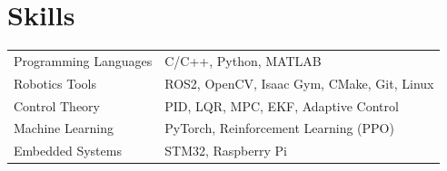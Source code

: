 \documentclass[a4paper,12pt]{article}
\begin{document}
\section{Skills}
\begin{tabularx}{\linewidth}{@{}l X@{}}
Programming Languages & \normalsize{C/C++, Python, MATLAB}\\
Robotics Tools & \normalsize{ROS2, OpenCV, Isaac Gym, CMake, Git, Linux}\\
Control Theory & \normalsize{PID, LQR, MPC, EKF, Adaptive Control}\\
Machine Learning & \normalsize{PyTorch, Reinforcement Learning (PPO)}\\
Embedded Systems & \normalsize{STM32, Raspberry Pi}\\
\end{tabularx}

\end{document}
